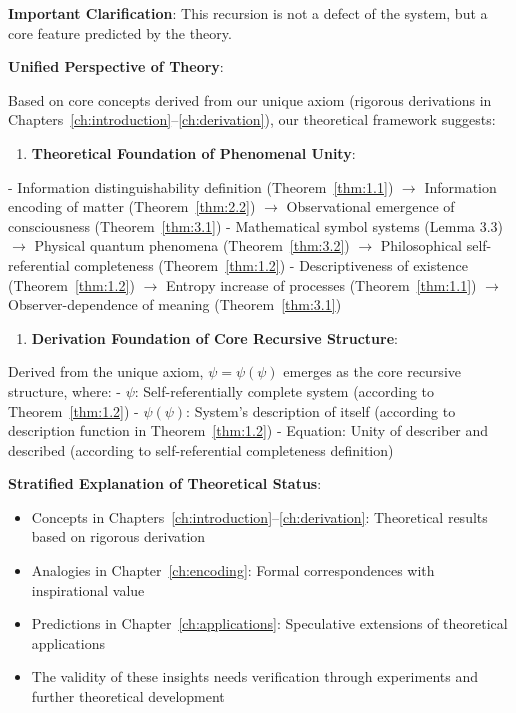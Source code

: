 \textbf{Important Clarification}: This recursion is not a defect of the system, but a core feature predicted by the theory.

\textbf{Unified Perspective of Theory}:

Based on core concepts derived from our unique axiom (rigorous derivations in Chapters~\ref{ch:introduction}--\ref{ch:derivation}), our theoretical framework suggests:

\begin{enumerate}
\item \textbf{Theoretical Foundation of Phenomenal Unity}:
\end{enumerate}
   - Information distinguishability definition (Theorem~\ref{thm:1.1}) $\rightarrow$ Information encoding of matter (Theorem~\ref{thm:2.2}) $\rightarrow$ Observational emergence of consciousness (Theorem~\ref{thm:3.1})
   - Mathematical symbol systems (Lemma 3.3) $\rightarrow$ Physical quantum phenomena (Theorem~\ref{thm:3.2}) $\rightarrow$ Philosophical self-referential completeness (Theorem~\ref{thm:1.2})
   - Descriptiveness of existence (Theorem~\ref{thm:1.2}) $\rightarrow$ Entropy increase of processes (Theorem~\ref{thm:1.1}) $\rightarrow$ Observer-dependence of meaning (Theorem~\ref{thm:3.1})

\begin{enumerate}
\item \textbf{Derivation Foundation of Core Recursive Structure}:
\end{enumerate}
   Derived from the unique axiom, $\psi = \psi(\psi)$ emerges as the core recursive structure, where:
   - $\psi$: Self-referentially complete system (according to Theorem~\ref{thm:1.2})
   - $\psi(\psi)$: System's description of itself (according to description function in Theorem~\ref{thm:1.2})
   - Equation: Unity of describer and described (according to self-referential completeness definition)

\textbf{Stratified Explanation of Theoretical Status}:
\begin{itemize}
\item Concepts in Chapters~\ref{ch:introduction}--\ref{ch:derivation}: Theoretical results based on rigorous derivation
\item Analogies in Chapter~\ref{ch:encoding}: Formal correspondences with inspirational value
\item Predictions in Chapter~\ref{ch:applications}: Speculative extensions of theoretical applications
\item The validity of these insights needs verification through experiments and further theoretical development
\end{itemize}


